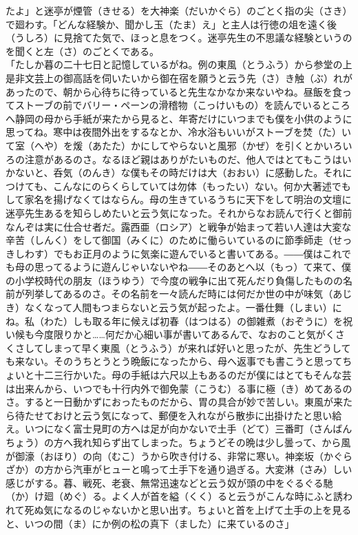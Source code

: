 \documentclass{book}
\begin{document}
たよ」と迷亭が煙管（きせる）を大神楽（だいかぐら）のごとく指の尖（さき）で廻わす。「どんな経験か、聞かし玉（たま）え」と主人は行徳の俎を遠く後（うしろ）に見捨てた気で、ほっと息をつく。迷亭先生の不思議な経験というのを聞くと左（さ）のごとくである。\\
「たしか暮の二十七日と記憶しているがね。例の東風（とうふう）から参堂の上是非文芸上の御高話を伺いたいから御在宿を願うと云う先（さ）き触（ぶ）れがあったので、朝から心待ちに待っていると先生なかなか来ないやね。昼飯を食ってストーブの前でバリー・ペーンの滑稽物（こっけいもの）を読んでいるところへ静岡の母から手紙が来たから見ると、年寄だけにいつまでも僕を小供のように思ってね。寒中は夜間外出をするなとか、冷水浴もいいがストーブを焚（た）いて室（へや）を煖（あたた）かにしてやらないと風邪（かぜ）を引くとかいろいろの注意があるのさ。なるほど親はありがたいものだ、他人ではとてもこうはいかないと、呑気（のんき）な僕もその時だけは大（おおい）に感動した。それにつけても、こんなにのらくらしていては勿体（もったい）ない。何か大著述でもして家名を揚げなくてはならん。母の生きているうちに天下をして明治の文壇に迷亭先生あるを知らしめたいと云う気になった。それからなお読んで行くと御前なんぞは実に仕合せ者だ。露西亜（ロシア）と戦争が始まって若い人達は大変な辛苦（しんく）をして御国（みくに）のために働らいているのに節季師走（せっきしわす）でもお正月のように気楽に遊んでいると書いてある。――僕はこれでも母の思ってるように遊んじゃいないやね――そのあとへ以（もっ）て来て、僕の小学校時代の朋友（ほうゆう）で今度の戦争に出て死んだり負傷したものの名前が列挙してあるのさ。その名前を一々読んだ時には何だか世の中が味気（あじき）なくなって人間もつまらないと云う気が起ったよ。一番仕舞（しまい）にね。私（わた）しも取る年に候えば初春（はつはる）の御雑煮（おぞうに）を祝い候も今度限りかと\ldots{}\ldots{}何だか心細い事が書いてあるんで、なおのこと気がくさくさしてしまって早く東風（とうふう）が来れば好いと思ったが、先生どうしても来ない。そのうちとうとう晩飯になったから、母へ返事でも書こうと思ってちょいと十二三行かいた。母の手紙は六尺以上もあるのだが僕にはとてもそんな芸は出来んから、いつでも十行内外で御免蒙（こうむ）る事に極（き）めてあるのさ。すると一日動かずにおったものだから、胃の具合が妙で苦しい。東風が来たら待たせておけと云う気になって、郵便を入れながら散歩に出掛けたと思い給え。いつになく富士見町の方へは足が向かないで土手（どて）三番町（さんばんちょう）の方へ我れ知らず出てしまった。ちょうどその晩は少し曇って、から風が御濠（おほり）の向（むこ）うから吹き付ける、非常に寒い。神楽坂（かぐらざか）の方から汽車がヒューと鳴って土手下を通り過ぎる。大変淋（さみ）しい感じがする。暮、戦死、老衰、無常迅速などと云う奴が頭の中をぐるぐる馳（か）け廻（めぐ）る。よく人が首を縊（くく）ると云うがこんな時にふと誘われて死ぬ気になるのじゃないかと思い出す。ちょいと首を上げて土手の上を見ると、いつの間（ま）にか例の松の真下（ました）に来ているのさ」\\
\end{document}
